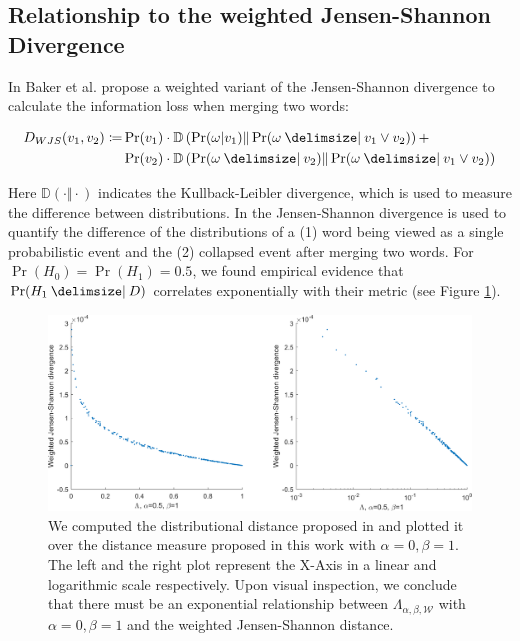  \subsection{Relationship to the weighted Jensen-Shannon Divergence}

In \cite{baker1998distributional} Baker et al. propose a weighted variant of the
Jensen-Shannon divergence to calculate the information loss when merging two
words:

\begin{equation*}
\begin{split}
D_{WJS}(v_1, v_2) \coloneqq &\Pr(v_1) \cdot
\mathbb{D}\left(\Pr(\omega|v_1)\Vert\Pr(\omega \given  v_1 \lor v_2)\right) + \\  
&\Pr(v_2) \cdot \mathbb{D}\left(\Pr(\omega \given v_2)\Vert\Pr(\omega\given v_1
\lor v_2)\right)
\end{split}
\end{equation*} 

Here $\mathbb{D}(\cdot \Vert \cdot)$ indicates the Kullback-Leibler divergence,
which is used to measure the difference between distributions.
In \cite{baker1998distributional} the Jensen-Shannon divergence is used to 
quantify the difference of the distributions of a (1) word being viewed as a
single probabilistic event and the (2) collapsed event after merging two words. 
For $\Pr(H_0) = \Pr(H_1) = 0.5$, we found empirical evidence that $\Pr(H_1\given
D)$ correlates exponentially with their metric (see Figure \ref{fig:jensen-shannon}).

\begin{figure}[htp]
\begin{center}
  \includegraphics[scale=0.5]{img/correlation-metric}
  \caption[Correlation of $\Lambda_{\alpha, \beta,\mathcal{W}}$
  with $\alpha=0, \beta=1$ with weighted Jensen-Shannon distance]{We
  computed the distributional distance proposed in
  \cite{baker1998distributional} and plotted it over the distance measure
  proposed in this work with $\alpha = 0, \beta=1$. The left and the right plot
  represent the X-Axis in a linear and logarithmic scale respectively.
  Upon visual inspection, we conclude that there must be an exponential
  relationship between $\Lambda_{\alpha, \beta,\mathcal{W}}$ with $\alpha=0, \beta=1$ and the weighted Jensen-Shannon distance.}
  \label{fig:jensen-shannon}
\end{center}
\end{figure}

